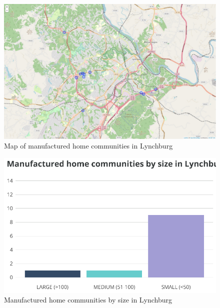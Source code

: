 \documentclass[
  letterpaper,
  DIV=11,
  numbers=noendperiod]{scrreprt}
\begin{document}
\begin{figure}[H]

{\centering \includegraphics{./part-3-3_files/figure-pdf/fig-mhc-1.pdf}

}

\caption{\label{fig-mhc}Map of manufactured home communities in
Lynchburg}

\end{figure}

\begin{figure}[H]

{\centering \includegraphics{./part-3-3_files/figure-pdf/fig-mhc-county-1.pdf}

}

\caption{\label{fig-mhc-county}Manufactured home communities by size in
Lynchburg}

\end{figure}
\end{document}
